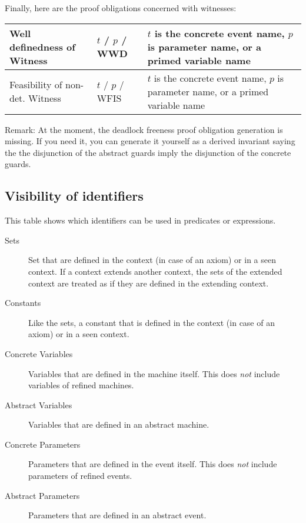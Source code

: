 Finally, here are the proof obligations concerned with witnesses:

\begin{center}
    \begin{tabular}{| p{6cm} | p{3cm} | p{5cm} |}
    \hline
	Well definedness of Witness & $t$  / $p$  / WWD & $t$ is the concrete event name, $p$ is parameter name, or a primed variable name \\ \hline
	Feasibility of non-det. Witness & $t$  / $p$  / WFIS & $t$ is the concrete event name, $p$ is parameter name, or a primed variable name \\ \hline
    \end{tabular}
\end{center}

Remark: At the moment, the deadlock freeness proof obligation generation is missing. If you need it, you can generate it yourself as a derived invariant saying the the disjunction of the abstract guards imply the disjunction of the concrete guards.

\subsection{Visibility of identifiers}
\label{visibility_of_identifiers}

This table shows which identifiers can be used in predicates or expressions. 
\begin{description}
\item[Sets] Set that are defined in the context (in case of an axiom) or in a seen context.
  If a context extends another context, the sets of the extended context are treated as if they
  are defined in the extending context.
\item[Constants] Like the sets, a constant that is defined in the context (in case of an axiom) or
  in a seen context.
\item[Concrete Variables] Variables that are defined in the machine itself. This does \emph{not}
  include variables of refined machines.
\item[Abstract Variables] Variables that are defined in an abstract machine.
\item[Concrete Parameters] Parameters that are defined in the event itself. This does \emph{not}
  include parameters of refined events.
\item[Abstract Parameters] Parameters that are defined in an abstract event.
\end{description}

